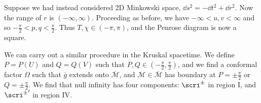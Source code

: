 \documentclass{jknotes}
\begin{document}
Suppose we had instead considered 2D Minkowski space, \(\dd{s}^2 = -\dd{t}^2 + \dd{r}^2\). Now the range of \(r\) is \((-\infty,\infty)\). Proceeding as before, we have \(-\infty < u,v < \infty\) and so \(-\frac{\pi}{2}<p,q<\frac{\pi}{2}\). Thus \(T,\chi\in(-\pi,\pi)\), and the Penrose diagram is now a square.
\begin{figure}[H]
    \centering
\end{figure}

We can carry out a similar procedure in the Kruskal spacetime. We define \(P=P(U)\) and \(Q=Q(V)\) such that \(P,Q\in\left(-\frac{\pi}{2},\frac{\pi}{2}\right)\), and we find a conformal factor \(\Omega\) such that \(\overline{g}\) extends onto \(\overline{\mathcal{M}}\), and \(\mathcal{M}\in\overline{\mathcal{M}}\) has boundary at \(P = \pm\frac{\pi}{2}\) or \(Q=\pm\frac{\pi}{2}\). We find that null infinity has four components: \(\scri^\pm\) in region I, and \({\scri^\pm}'\) in region IV.
\end{document}
